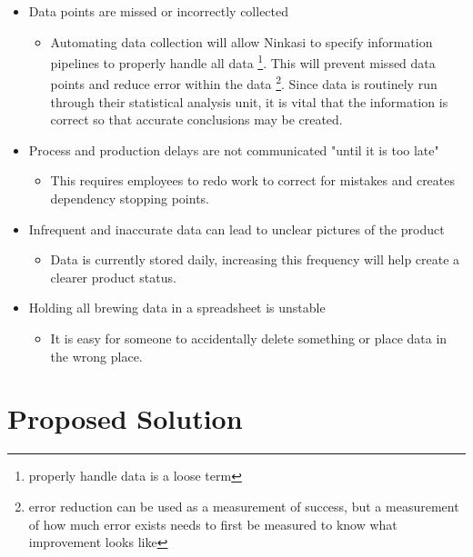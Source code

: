 \documentclass[draftclsnofoot,onecolumn,letterpaper,10pt]{IEEEtran}
\begin{document}
\begin{itemize}
	\item {Data points are missed or incorrectly collected}
      		\begin{itemize}
			\item {Automating data collection will allow Ninkasi to specify information pipelines to properly handle all data \footnote{properly handle data is a loose term}. This will prevent missed data points and reduce error within the data \footnote{error reduction can be used as a measurement of success, but a measurement of how much error exists needs to first be measured to know what improvement looks like}. Since data is routinely run through their statistical analysis unit, it is vital that the information is correct so that accurate conclusions may be created.}
      		\end{itemize}

	\item {Process and production delays are not communicated "until it is too late"}
		\begin{itemize}
			\item {This requires employees to redo work to correct for mistakes and creates dependency stopping points.}
		\end{itemize}

	\item {Infrequent and inaccurate data can lead to unclear pictures of the product}
		\begin{itemize}
			\item {Data is currently stored daily, increasing this frequency will help create a clearer product status.}
		\end{itemize}

	\item {Holding all brewing data in a spreadsheet is unstable}
		\begin{itemize}
			\item {It is easy for someone to accidentally delete something or place data in the wrong place.}
		\end{itemize}

	\end{itemize}


\section{\textbf{Proposed Solution}}
\end{document}
